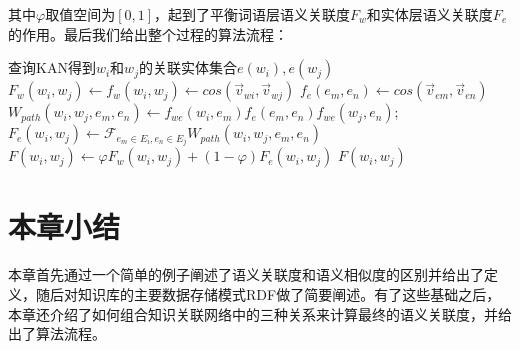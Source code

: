 \noindent 其中$\varphi$取值空间为$[0,1]$，起到了平衡词语层语义关联度$F_w$和实体层语义关联度$F_e$的作用。最后我们给出整个过程的算法流程：

\begin{algorithm}
    \label{alg:kan-sr}
    \BlankLine
    查询KAN得到$w_i$和$w_j$的关联实体集合$e(w_i), e(w_j)$ \;
    $F_w(w_i, w_j) \leftarrow f_w(w_i, w_j) \leftarrow cos(\vec v_{wi},\vec v_{wj})$ \;
     {
        $f_e(e_m, e_n) \leftarrow cos(\vec v_{em},\vec v_{en})$ \;
        $W_{path}(w_i, w_j, e_m, e_n) \leftarrow f_{we}(w_i, e_m)f_e(e_m, e_n)f_{we}(w_j, e_n)$; \;
    }
    $F_e(w_i, w_j) \leftarrow \mathscr{F}_{e_m \in E_i,e_n \in E_j}W_{path}(w_i, w_j, e_m, e_n)$ \;
    $F(w_i, w_j) \leftarrow \varphi F_w(w_i, w_j) + (1 - \varphi) F_e(w_i, w_j)$ \;
    \Return $F(w_i, w_j)$
\end{algorithm}

\section{本章小结}
本章首先通过一个简单的例子阐述了语义关联度和语义相似度的区别并给出了定义，随后对知识库的主要数据存储模式RDF做了简要阐述。有了这些基础之后，本章还介绍了如何组合知识关联网络中的三种关系来计算最终的语义关联度，并给出了算法流程。
